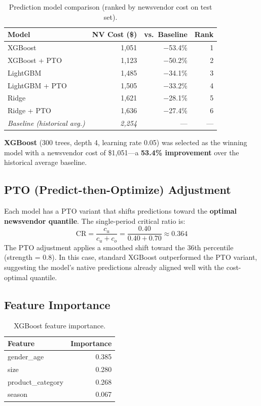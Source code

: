 \documentclass[11pt, letterpaper]{article}
\begin{document}
\begin{table}[H]
\centering
\caption{Prediction model comparison (ranked by newsvendor cost on test set).}
\label{tab:prediction-results}
\begin{tabular}{@{}lrrr@{}}
\toprule
\textbf{Model} & \textbf{NV Cost (\$)} & \textbf{vs.\ Baseline} & \textbf{Rank} \\
\midrule
XGBoost             & 1,051 & $-$53.4\% & 1 \\
XGBoost + PTO       & 1,123 & $-$50.2\% & 2 \\
LightGBM            & 1,485 & $-$34.1\% & 3 \\
LightGBM + PTO      & 1,505 & $-$33.2\% & 4 \\
Ridge               & 1,621 & $-$28.1\% & 5 \\
Ridge + PTO          & 1,636 & $-$27.4\% & 6 \\
\midrule
\emph{Baseline (historical avg.)} & \emph{2,254} & --- & --- \\
\bottomrule
\end{tabular}
\end{table}

\textbf{XGBoost} (300 trees, depth 4, learning rate 0.05) was selected as the winning model with a newsvendor cost of \$1,051---a \textbf{53.4\% improvement} over the historical average baseline.

\subsection{PTO (Predict-then-Optimize) Adjustment}

Each model has a PTO variant that shifts predictions toward the \textbf{optimal newsvendor quantile}. The single-period critical ratio is:
\[
\text{CR} = \frac{c_u}{c_u + c_o} = \frac{0.40}{0.40 + 0.70} \approx 0.364
\]
The PTO adjustment applies a smoothed shift toward the 36th percentile (strength = 0.8). In this case, standard XGBoost outperformed the PTO variant, suggesting the model's native predictions already aligned well with the cost-optimal quantile.

\subsection{Feature Importance}

\begin{table}[H]
\centering
\caption{XGBoost feature importance.}
\label{tab:feature-importance}
\begin{tabular}{@{}lr@{}}
\toprule
\textbf{Feature} & \textbf{Importance} \\
\midrule
gender\_age & 0.385 \\
size & 0.280 \\
product\_category & 0.268 \\
season & 0.067 \\
\bottomrule
\end{tabular}
\end{table}
\end{document}
